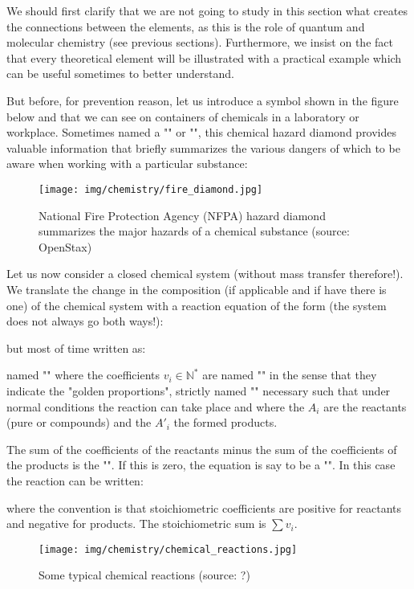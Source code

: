 	We should first clarify that we are not going to study in this section what creates the connections between the elements, as this is the role of quantum and molecular chemistry (see previous sections). Furthermore, we insist on the fact that every theoretical element will be illustrated with a practical example which can be useful sometimes to better understand.
	
	But before, for prevention reason, let us introduce a symbol shown in the figure below and that we can see on containers of chemicals in a laboratory or workplace. Sometimes named a "" or "", this chemical hazard diamond provides valuable information that briefly summarizes the various dangers of which to be aware when working with a particular
substance:
	\begin{figure}[H]
		\centering
		\texttt{[image: img/chemistry/fire\_diamond.jpg]}
		\caption[National Fire Protection Agency (NFPA) hazard diamond]{National Fire Protection Agency (NFPA) hazard diamond summarizes the major hazards of a chemical substance (source: OpenStax)}
	\end{figure}
	
	Let us now consider a closed chemical system (without mass transfer therefore!). We translate the change in the composition (if applicable and if have there is one) of the chemical system with a reaction equation of the form (the system does not always go both ways!):
	
	but most of time written as:
	
	named "" where the coefficients $v_i \in \mathbb{N}^*$ are named  "" in the sense that they indicate the "golden proportions", strictly named "" necessary such that under normal conditions the reaction can take place and where the $A_i$ are the reactants (pure or compounds) and the ${A'}_i$ the formed products.
	
	The sum of the coefficients of the reactants minus the sum of the coefficients of the products is the "\label{stoichiometric sum}". If this is zero, the equation is say to be a "". In this case the reaction can be written:
	
	where the convention is that stoichiometric coefficients are positive for reactants and negative for products. The stoichiometric sum is $\sum v_i$.
	\begin{figure}[H]
		\centering
		\texttt{[image: img/chemistry/chemical\_reactions.jpg]}
		\caption[Some typical chemical reactions]{Some typical chemical reactions (source: ?)}
	\end{figure}
	
